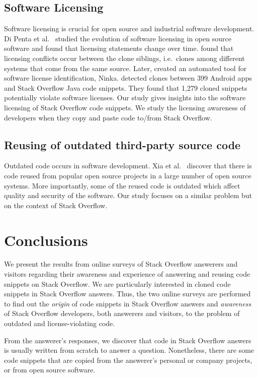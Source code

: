 \documentclass{svjour3}                     %
\begin{document}
\subsection{Software Licensing} Software licensing is crucial for open source
and industrial software development. Di Penta et al.~\cite{DiPenta2010} studied
the evolution of software licensing in open source software and found that
licensing statements change over time. \cite{German2009} found that licensing
conflicts occur between the clone siblings, i.e.~clones among different systems
that come from the same source. Later, \cite{German2010} created an automated
tool for software license identification, Ninka. \cite{An2017} detected clones
between 399 Android apps and Stack Overflow Java code snippets. They found  that
1,279 cloned snippets potentially violate software licenses. Our study gives
insights into the software licensing of Stack Overflow code snippets. We study
the licensing awareness of developers when they copy and paste code to/from
Stack Overflow.

\subsection{Reusing of outdated third-party source code} Outdated code occurs in
software development. Xia et al.~\cite{Xia2014} discover that there is code
reused from popular open source projects in a large number of open source
systems. More importantly, some of the reused code is outdated which affect
quality and security of the software. Our study focuses on a similar problem but
on the context of Stack Overflow.

\section{Conclusions}

We present the results from online surveys of Stack Overflow answerers and
visitors regarding their awareness and experience of answering and reusing code
snippets on Stack Overflow. We are particularly interested in cloned code
snippets in Stack Overflow answers. Thus, the two online surveys are performed to
find out the \textit{origin} of code snippets in Stack Overflow answers and
\textit{awareness} of Stack Overflow developers, both answerers and visitors,
to the problem of outdated and license-violating code.

From the answerer's responses, we discover that code in Stack Overflow answers
is usually written from scratch to answer a question. Nonetheless, there are
some code snippets that are copied from the answerer's personal or company
projects, or from open source software.
\end{document}
